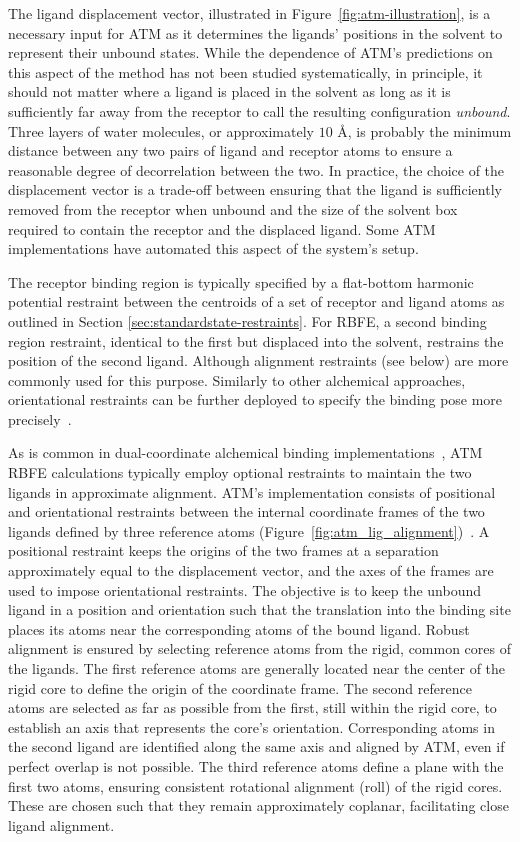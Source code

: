 \documentclass[9pt,bestpractices]{livecoms}
\begin{document}
The ligand displacement vector, illustrated in Figure~\ref{fig:atm-illustration}, is a necessary input for ATM as it determines the ligands' positions in the solvent to represent their unbound states.
While the dependence of ATM's predictions on this aspect of the method has not been studied systematically, in principle, it should not matter where a ligand is placed in the solvent as long as it is sufficiently far away from the receptor to call the resulting configuration \emph{unbound}. Three layers of water molecules, or approximately $10$ \AA, is probably the minimum distance between any two pairs of ligand and receptor atoms to ensure a reasonable degree of decorrelation between the two. In practice, the choice of the displacement vector is a trade-off between ensuring that the ligand is sufficiently removed from the receptor when unbound and the size of the solvent box required to contain the receptor and the displaced ligand. Some ATM implementations have automated this aspect of the system's setup.

The receptor binding region is typically specified by a flat-bottom harmonic potential restraint between the centroids of a set of receptor and ligand atoms as outlined in Section \ref{sec:standardstate-restraints}. For RBFE, a second binding region restraint, identical to the first but displaced into the solvent, restrains the position of the second ligand. Although alignment restraints (see below) are more commonly used for this purpose.  Similarly to other alchemical approaches, orientational restraints can be further deployed to specify the binding pose more precisely~\cite{khuttan2023taming}.

As is common in dual-coordinate alchemical binding implementations~\cite{Ries_2022}, ATM RBFE calculations typically employ optional restraints to maintain the two ligands in approximate alignment. ATM's implementation consists of positional and orientational restraints between the internal coordinate frames of the two ligands defined by three reference atoms (Figure~\ref{fig:atm_lig_alignment})~\cite{azimi2022application}. A positional restraint keeps the origins of the two frames at a separation approximately equal to the displacement vector, and the axes of the frames are used to impose orientational restraints. The objective is to keep the unbound ligand in a position and orientation such that the translation into the binding site places its atoms near the corresponding atoms of the bound ligand. Robust alignment is ensured by selecting reference atoms from the rigid, common cores of the ligands. The first reference atoms are generally located near the center of the rigid core to define the origin of the coordinate frame. The second reference atoms are selected as far as possible from the first, still within the rigid core, to establish an axis that represents the core's orientation. Corresponding atoms in the second ligand are identified along the same axis and aligned by ATM, even if perfect overlap is not possible. The third reference atoms define a plane with the first two atoms, ensuring consistent rotational alignment (roll) of the rigid cores. These are chosen such that they remain approximately coplanar, facilitating close ligand alignment.
\end{document}
